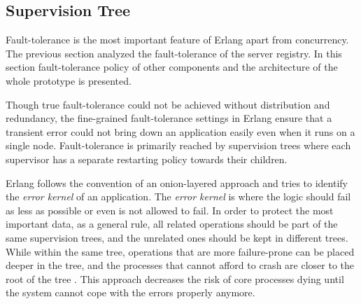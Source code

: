 \subsection{Supervision Tree}\label{supervision_tree}




Fault-tolerance is the most important feature of Erlang apart from concurrency. The previous section analyzed the fault-tolerance of the server registry. In this section fault-tolerance policy of other components and the architecture of the whole prototype is presented.

Though true fault-tolerance could not be achieved without distribution and redundancy, the fine-grained fault-tolerance settings in Erlang ensure that a transient error could not bring down an application easily even when it runs on a single node. Fault-tolerance is primarily reached by supervision trees where each supervisor has a separate restarting policy towards their children. 

Erlang follows the convention of an onion-layered approach and tries to identify the \textit{error kernel} of an application. The \textit{error kernel} is where the logic should fail as less as possible or even is not allowed to fail. In order to protect the most important data, as a general rule, all related operations should be part of the same supervision trees, and the unrelated ones should be kept in different trees. While within the same tree, operations that are more failure-prone can be placed deeper in the tree, and the processes that cannot afford to crash are closer to the root of the tree \autocite{learn_you_some_erlang}. This approach decreases the risk of core processes dying until the system cannot cope with the errors properly anymore.

